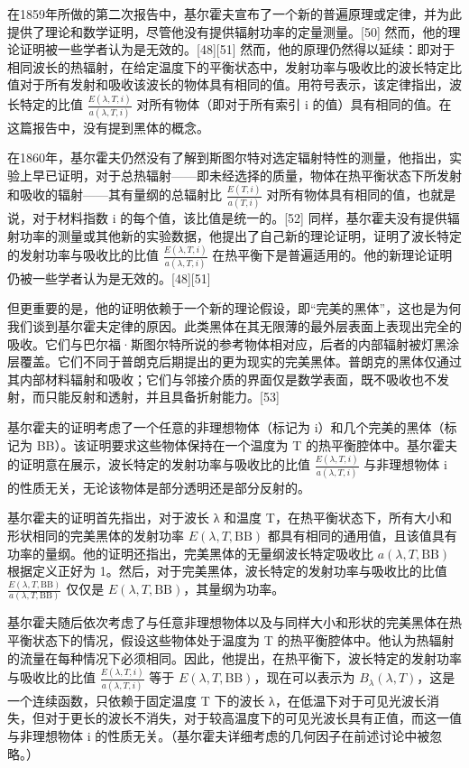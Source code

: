 在1859年所做的第二次报告中，基尔霍夫宣布了一个新的普遍原理或定律，并为此提供了理论和数学证明，尽管他没有提供辐射功率的定量测量。[50] 然而，他的理论证明被一些学者认为是无效的。[48][51] 然而，他的原理仍然得以延续：即对于相同波长的热辐射，在给定温度下的平衡状态中，发射功率与吸收比的波长特定比值对于所有发射和吸收该波长的物体具有相同的值。用符号表示，该定律指出，波长特定的比值 \( \frac{E(\lambda, T, i)}{a(\lambda, T, i)} \) 对所有物体（即对于所有索引 i 的值）具有相同的值。在这篇报告中，没有提到黑体的概念。

在1860年，基尔霍夫仍然没有了解到斯图尔特对选定辐射特性的测量，他指出，实验上早已证明，对于总热辐射——即未经选择的质量，物体在热平衡状态下所发射和吸收的辐射——其有量纲的总辐射比 \( \frac{E(T, i)}{a(T, i)} \) 对所有物体具有相同的值，也就是说，对于材料指数 i 的每个值，该比值是统一的。[52] 同样，基尔霍夫没有提供辐射功率的测量或其他新的实验数据，他提出了自己新的理论证明，证明了波长特定的发射功率与吸收比的比值 \( \frac{E(\lambda, T, i)}{a(\lambda, T, i)} \) 在热平衡下是普遍适用的。他的新理论证明仍被一些学者认为是无效的。[48][51]

但更重要的是，他的证明依赖于一个新的理论假设，即“完美的黑体”，这也是为何我们谈到基尔霍夫定律的原因。此类黑体在其无限薄的最外层表面上表现出完全的吸收。它们与巴尔福·斯图尔特所说的参考物体相对应，后者的内部辐射被灯黑涂层覆盖。它们不同于普朗克后期提出的更为现实的完美黑体。普朗克的黑体仅通过其内部材料辐射和吸收；它们与邻接介质的界面仅是数学表面，既不吸收也不发射，而只能反射和透射，并且具备折射能力。[53]

基尔霍夫的证明考虑了一个任意的非理想物体（标记为 i）和几个完美的黑体（标记为 BB）。该证明要求这些物体保持在一个温度为 T 的热平衡腔体中。基尔霍夫的证明意在展示，波长特定的发射功率与吸收比的比值 \( \frac{E(\lambda, T, i)}{a(\lambda, T, i)} \) 与非理想物体 i 的性质无关，无论该物体是部分透明还是部分反射的。

基尔霍夫的证明首先指出，对于波长 λ 和温度 T，在热平衡状态下，所有大小和形状相同的完美黑体的发射功率 \( E(\lambda, T, \text{BB}) \) 都具有相同的通用值，且该值具有功率的量纲。他的证明还指出，完美黑体的无量纲波长特定吸收比 \( a(\lambda, T, \text{BB}) \) 根据定义正好为 1。然后，对于完美黑体，波长特定的发射功率与吸收比的比值 \( \frac{E(\lambda, T, \text{BB})}{a(\lambda, T, \text{BB})} \) 仅仅是 \( E(\lambda, T, \text{BB}) \)，其量纲为功率。

基尔霍夫随后依次考虑了与任意非理想物体以及与同样大小和形状的完美黑体在热平衡状态下的情况，假设这些物体处于温度为 T 的热平衡腔体中。他认为热辐射的流量在每种情况下必须相同。因此，他提出，在热平衡下，波长特定的发射功率与吸收比的比值 \( \frac{E(\lambda, T, i)}{a(\lambda, T, i)} \) 等于 \( E(\lambda, T, \text{BB}) \)，现在可以表示为 \( B_\lambda (\lambda, T) \)，这是一个连续函数，只依赖于固定温度 T 下的波长 λ，在低温下对于可见光波长消失，但对于更长的波长不消失，对于较高温度下的可见光波长具有正值，而这一值与非理想物体 i 的性质无关。（基尔霍夫详细考虑的几何因子在前述讨论中被忽略。）

